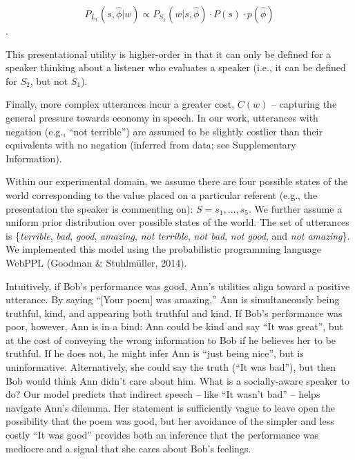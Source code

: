 \documentclass[floatsintext,man]{apa6}
\theoremstyle{definition}
\theoremstyle{definition}
\theoremstyle{definition}
\theoremstyle{remark}
\begin{document}
\[P_{L_1}(s, \hat{\phi} | w) \propto P_{S_1}(w | s, \hat{\phi}) \cdot P(s) \cdot p(\hat{\phi})\].

This presentational utility is higher-order in that it can only be
defined for a speaker thinking about a listener who evaluates a speaker
(i.e., it can be defined for \(S_2\), but not \(S_1\)).

Finally, more complex utterances incur a greater cost, \(C(w)\) --
capturing the general pressure towards economy in speech. In our work,
utterances with negation (e.g., \enquote{not terrible}) are assumed to
be slightly costlier than their equivalents with no negation (inferred
from data; see Supplementary Information).

Within our experimental domain, we assume there are four possible states
of the world corresponding to the value placed on a particular referent
(e.g., the presentation the speaker is commenting on):
\(S = {s_1,...,s_5}\). We further assume a uniform prior distribution
over possible states of the world. The set of utterances is
\{\emph{terrible}, \emph{bad}, \emph{good}, \emph{amazing}, \emph{not
terrible}, \emph{not bad}, \emph{not good}, and \emph{not amazing}\}. We
implemented this model using the probabilistic programming language
WebPPL (Goodman \& Stuhlmüller, 2014).

Intuitively, if Bob's performance was good, Ann's utilities align toward
a positive utterance. By saying \enquote{{[}Your poem{]} was amazing,}
Ann is simultaneously being truthful, kind, and appearing both truthful
and kind. If Bob's performance was poor, however, Ann is in a bind: Ann
could be kind and say \enquote{It was great}, but at the cost of
conveying the wrong information to Bob if he believes her to be
truthful. If he does not, he might infer Ann is \enquote{just being
nice}, but is uninformative. Alternatively, she could say the truth
(\enquote{It was bad}), but then Bob would think Ann didn't care about
him. What is a socially-aware speaker to do? Our model predicts that
indirect speech -- like \enquote{It wasn't bad} -- helps navigate Ann's
dilemma. Her statement is sufficiently vague to leave open the
possibility that the poem was good, but her avoidance of the simpler and
less costly \enquote{It was good} provides both an inference that the
performance was mediocre and a signal that she cares about Bob's
feelings.
\end{document}
